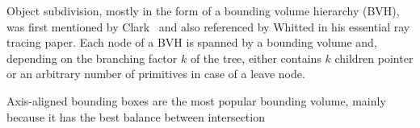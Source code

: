 Object subdivision, mostly in the form of a bounding volume hierarchy (BVH), was first mentioned by Clark~\cite{clark1976bvh} and also referenced by Whitted\cite{whitted_improved_1980} in his essential ray tracing paper. Each node of a BVH is spanned by a bounding volume and, depending on the branching factor $k$ of the tree, either contains $k$ children pointer or an arbitrary number of primitives in case of a leave node. 





Axis-aligned bounding boxes are the most popular bounding volume, mainly because it has the best balance between intersection